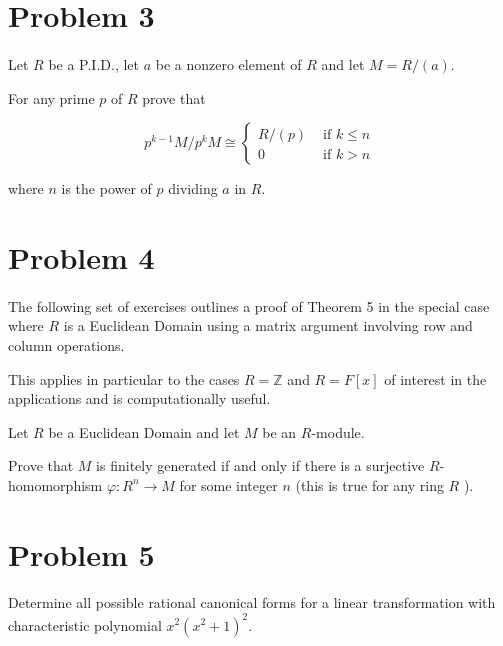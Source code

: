 \documentclass{article}
\begin{document}
\section*{Problem 3}\paragraph{}Let $R$ be a P.I.D., let $a$ be a nonzero element of $R$ and let $M=R /(a)$.

For any prime $p$ of $R$ prove that

$$
p^{k-1} M / p^k M \cong \begin{cases}R /(p) & \text { if } k \leq n \\ 0 & \text { if } k>n\end{cases}
$$

where $n$ is the power of $p$ dividing $a$ in $R$.

\section*{Problem 4}\paragraph{}The following set of exercises outlines a proof of Theorem 5 in the special case where $R$ is a Euclidean Domain using a matrix argument involving row and column operations.

This applies in particular to the cases $R=\mathbb{Z}$ and $R=F[x]$ of interest in the applications and is computationally useful.

Let $R$ be a Euclidean Domain and let $M$ be an $R$-module.

Prove that $M$ is finitely generated if and only if there is a surjective $R$-homomorphism $\varphi: R^n \rightarrow M$ for some integer $n$ (this is true for any ring $R$ ).

\section*{Problem 5}\paragraph{}Determine all possible rational canonical forms for a linear transformation with characteristic polynomial $x^2\left(x^2+1\right)^2$.
\end{document}
